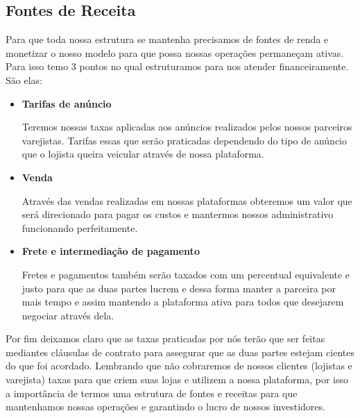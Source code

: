 \documentclass[a4paper]{article}
\begin{document}
\subsection{Fontes de Receita}
\par Para que toda nossa estrutura se mantenha precisamos de fontes de renda e monetizar o nosso modelo para que possa nossas operações permaneçam ativas. Para isso temo 3 pontos no qual estruturamos para nos atender financeiramente. São elas: 
\begin{itemize}
    \item \textbf{Tarifas de anúncio}
    \par Teremos nossas taxas aplicadas aos anúncios realizados pelos nossos parceiros varejistas. Tarifas essas que serão praticadas dependendo do tipo de anúncio que o lojista queira veicular através de nossa plataforma.
    \item \textbf{Venda}
    \par Através das vendas realizadas em nossas plataformas obteremos um valor que será direcionado para pagar os custos e mantermos nossos administrativo funcionando perfeitamente.
    \item \textbf{Frete e intermediação de pagamento}
    \par Fretes e pagamentos também serão taxados com um percentual equivalente e justo para que as duas partes lucrem e dessa forma manter a parceira por mais tempo e assim mantendo a plataforma ativa para todos que desejarem negociar através dela.
\end{itemize}
\par Por fim deixamos claro que as taxas praticadas por nós terão que ser feitas mediantes cláusulas de contrato para assegurar que as duas partes estejam cientes do que foi acordado. Lembrando que não cobraremos de nossos clientes (lojistas e varejista) taxas para que criem suas lojas e utilizem a nossa plataforma, por isso a importância de termos uma estrutura de fontes e receitas para que mantenhamos nossas operações e garantindo o lucro de nossos investidores.
\end{document}
